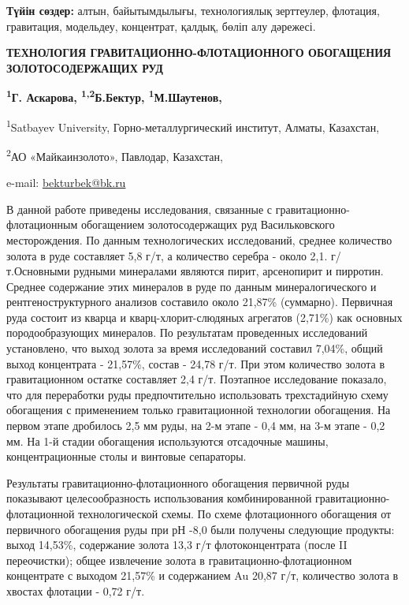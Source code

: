 {\bfseries Түйін сөздер:} алтын, байытымдылығы, технологиялық зерттеулер,
флотация, гравитация, модельдеу, концентрат, қалдық, бөліп алу дәрежесі.
\begin{articleheader}

{\bfseries ТЕХНОЛОГИЯ ГРАВИТАЦИОННО-ФЛОТАЦИОННОГО ОБОГАЩЕНИЯ
ЗОЛОТОСОДЕРЖАЩИХ РУД}

{\bfseries \textsuperscript{1}Г. Аскарова,
\textsuperscript{1,2}Б.Бектур\textsuperscript{\envelope },
  \textsuperscript{1}М.Шаутенов, }
\end{articleheader}
\begin{affiliation}
\textsuperscript{1}Satbayev University, Горно-металлургический институт,
Алматы, Казахстан,

\textsuperscript{2}АО «Майкаинзолото», Павлодар, Казахстан,

e-mail: \href{mailto:bekturbek@bk.run}{bekturbek@bk.ru}
\end{affiliation}

В данной работе приведены исследования, связанные с
гравитационно-флотационным обогащением золотосодержащих руд
Васильковского месторождения. По данным технологических исследований,
среднее количество золота в руде составляет 5,8 г/т, а количество
серебра - около 2,1. г/т.Основными рудными минералами являются пирит,
арсенопирит и пирротин. Среднее содержание этих минералов в руде по
данным минералогического и рентгеноструктурного анализов составило около
21,87\% (суммарно). Первичная руда состоит из кварца и
кварц-хлорит-слюдяных агрегатов (2,71\%) как основных породообразующих
минералов. По результатам проведенных исследований установлено, что выход
золота за время исследований составил 7,04\%, общий выход концентрата -
21,57\%, состав - 24,78 г/т. При этом количество золота в гравитационном
остатке составляет 2,4 г/т. Поэтапное исследование показало, что для
переработки руды предпочтительно использовать трехстадийную схему
обогащения с применением только гравитационной технологии обогащения. На
первом этапе дробилось 2,5 мм руды, на 2-м этапе - 0,4 мм, на 3-м этапе
- 0,2 мм. На 1-й стадии обогащения используются отсадочные машины,
концентрационные столы и винтовые сепараторы.

Результаты гравитационно-флотационного обогащения первичной руды
показывают целесообразность использования комбинированной
гравитационно-флотационной технологической схемы. По схеме флотационного
обогащения от первичного обогащения руды при рН -8,0 были получены
следующие продукты: выход 14,53\%, содержание золота 13,3 г/т
флотоконцентрата (после II переочистки); общее извлечение золота в
гравитационно-флотационном концентрате с выходом 21,57\% и содержанием
Au 20,87 г/т, количество золота в хвостах флотации - 0,72 г/т.

